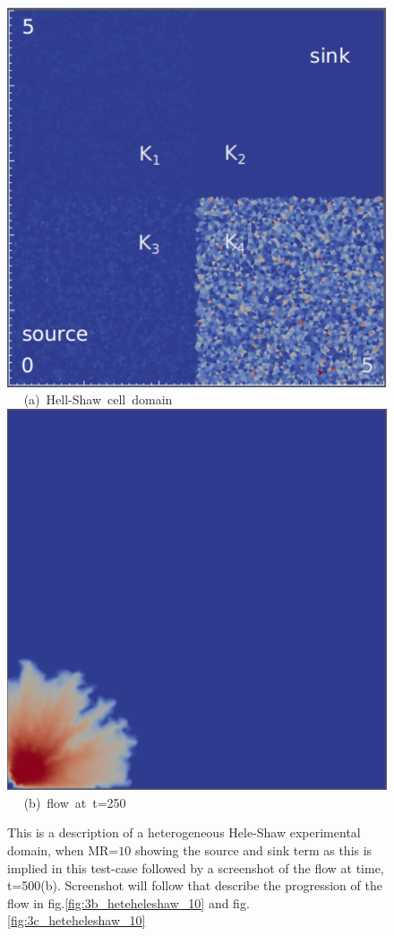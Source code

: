 \documentclass[preprint,authoryear,12pt]{elsarticle}
\begin{document}
\begin{figure}[h]
\vbox{
\hbox{\hspace{3.5cm}
\includegraphics[width=.5\textwidth]{./Pics1/Saffman_heterogeneous/saffman_heter_fixed_1.pdf} 
}
\vspace{0.0cm}
\hbox{\hspace{5.0cm} (a) Hell-Shaw cell domain   
}
\vspace{0.25cm}
\hbox{\hspace{3.5cm}
\includegraphics[width=.5\textwidth]{./Pics1/Saffman_heterogeneous/saffman_heter_fixed_500.pdf}
}
\vspace{0.0cm}
\hbox{\hspace{5.0cm} (b) flow at t=250     
}
}     
\caption{This is a description of a heterogeneous Hele-Shaw experimental domain, when MR=$10$ showing the source and sink term as this is implied in this test-case followed by a screenshot of the flow at time, t=500(b). Screenshot will follow that describe the progression of the flow in fig.\ref{fig:3b_heteheleshaw_10} and fig.\ref{fig:3c_heteheleshaw_10}}
\label{fig:3a_heteheleshaw_10}
\end{figure}
\end{document}
